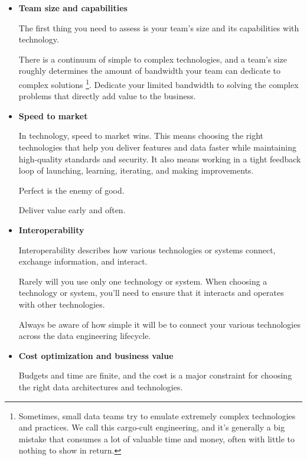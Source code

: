 \begin{itemize}
    \item \textbf{Team size and capabilities}
    
    \noindent
    The first thing you need to assess is your team's size
    and its capabilities with technology.

    There is a continuum of simple to complex technologies,
    and a team's size roughly determines the amount of
    bandwidth your team can dedicate to complex solutions
    \footnote{
        Sometimes, small data teams try to emulate extremely
        complex technologies and practices. We call this
        cargo-cult engineering, and it's generally a big
        mistake that consumes a lot of valuable time and
        money, often with little to nothing to show in
        return.
    }.
    Dedicate your limited bandwidth to solving the complex
    problems that directly add value to the business.


    \item \textbf{Speed to market}
    
    \noindent
    In technology, speed to market wins.
    This means choosing the right technologies that help
    you deliver features and data faster while maintaining
    high-quality standards and security. It also means
    working in a tight feedback loop of launching, learning,
    iterating, and making improvements.
    
    Perfect is the enemy of good.
    
    Deliver value early and often.
    
    
    \item \textbf{Interoperability}
    
    \noindent
    Interoperability describes how various technologies or
    systems connect, exchange information, and interact.

    Rarely will you use only one technology or system.
    When choosing a technology or system, you'll need to
    ensure that it interacts and operates with other
    technologies.

    Always be aware of how simple it will be to connect
    your various technologies across the data engineering
    lifecycle.


    \item \textbf{Cost optimization and business value}
        
    \noindent
    Budgets and time are finite, and the cost is a major
    constraint for choosing the right data architectures
    and technologies.


\end{itemize}
